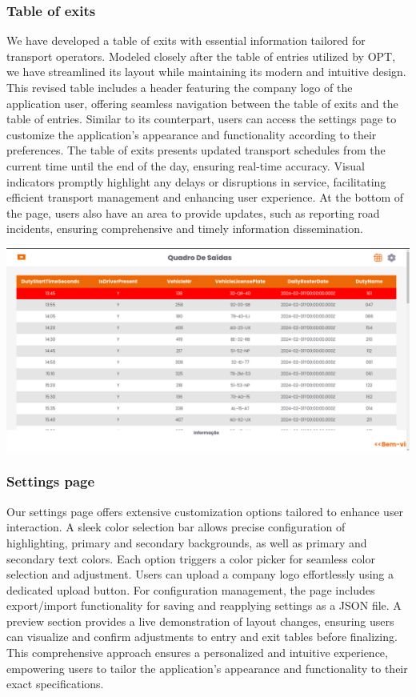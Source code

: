 \documentclass[10pt]{article}
\begin{document}
            \vfill

        \subsubsection{Table of exits}

        We have developed a table of exits with essential information tailored for transport operators. Modeled closely after the table of entries utilized by OPT, we have streamlined its layout while maintaining its modern and intuitive design. This revised table includes a header featuring the company logo of the application user, offering seamless navigation between the table of exits and the table of entries.
        Similar to its counterpart, users can access the settings page to customize the application's appearance and functionality according to their preferences. The table of exits presents updated transport schedules from the current time until the end of the day, ensuring real-time accuracy. Visual indicators promptly highlight any delays or disruptions in service, facilitating efficient transport management and enhancing user experience.
        At the bottom of the page, users also have an area to provide updates, such as reporting road incidents, ensuring comprehensive and timely information dissemination.

            \vfill
        \includegraphics[width=1\textwidth]{table_of_exits}
            \vfill

        \subsubsection{Settings page}

        Our settings page offers extensive customization options tailored to enhance user interaction. A sleek color selection bar allows precise configuration of highlighting, primary and secondary backgrounds, as well as primary and secondary text colors. Each option triggers a color picker for seamless color selection and adjustment.
        Users can upload a company logo effortlessly using a dedicated upload button. For configuration management, the page includes export/import functionality for saving and reapplying settings as a JSON file. A preview section provides a live demonstration of layout changes, ensuring users can visualize and confirm adjustments to entry and exit tables before finalizing.
        This comprehensive approach ensures a personalized and intuitive experience, empowering users to tailor the application's appearance and functionality to their exact specifications.
\end{document}
